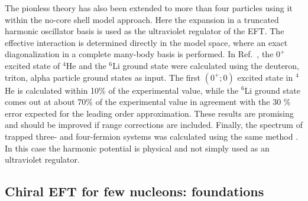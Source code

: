 \documentclass[aps,rmp,nofootinbib,twocolumn,floatfix]{revtex4}
\begin{document}
The pionless theory has also been extended to more than four particles
using it within the no-core shell model approach. Here the expansion
in a truncated harmonic oscillator basis is used as the 
ultraviolet regulator of the EFT. The effective interaction is determined
directly in the model space, where an exact diagonalization in a complete 
many-body basis is performed. In Ref.~\cite{Stetcu:2006ey},
the $0^+$ excited state of $^4$He and the $^6$Li ground state were 
calculated using the deuteron, triton, alpha particle ground states 
as input. The first $(0^+;0)$ excited state in $^4$He is calculated within
10\% of the experimental value, while the $^6$Li ground state comes out
at about 70\% of the experimental value in agreement with the 
30 \% error expected for the leading order approximation. These results
are promising and should be improved if range corrections are
included.
Finally, the spectrum of trapped three- and four-fermion systems
was calculated using the same method \cite{Stetcu:2007ms}. In this 
case the harmonic potential is physical and not simply used as an 
ultraviolet regulator.
 



\subsection{Chiral EFT for few nucleons: foundations}
\label{sec:chiralEFT}
\end{document}
